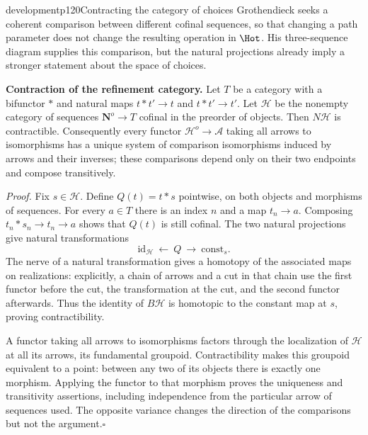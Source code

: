 \begin{dcomment}{development}{p120}{Contracting the category of choices}
Grothendieck seeks a coherent comparison between different cofinal sequences, so that changing a path parameter does not change the resulting operation in $\Hot$. His three-sequence diagram supplies this comparison, but the natural projections already imply a stronger statement about the space of choices.

\textbf{Contraction of the refinement category.}\ours\quad
Let $T$ be a category with a bifunctor $*$ and natural maps $t*t'\to t$ and $t*t'\to t'$. Let $\mathcal H$ be the nonempty category of sequences $\mathbf N^o\to T$ cofinal in the preorder of objects. Then $N\mathcal H$ is contractible. Consequently every functor $\mathcal H^o\to\mathcal A$ taking all arrows to isomorphisms has a unique system of comparison isomorphisms induced by arrows and their inverses; these comparisons depend only on their two endpoints and compose transitively.

\textit{Proof.} Fix $s\in\mathcal H$. Define $Q(t)=t*s$ pointwise, on both objects and morphisms of sequences. For every $a\in T$ there is an index $n$ and a map $t_n\to a$. Composing $t_n*s_n\to t_n\to a$ shows that $Q(t)$ is still cofinal. The two natural projections give natural transformations
\[
 \mathrm{id}_{\mathcal H}\ \longleftarrow\ Q\ \longrightarrow\ \mathrm{const}_s.
\]
The nerve of a natural transformation gives a homotopy of the associated maps on realizations: explicitly, a chain of arrows and a cut in that chain use the first functor before the cut, the transformation at the cut, and the second functor afterwards. Thus the identity of $B\mathcal H$ is homotopic to the constant map at $s$, proving contractibility.

A functor taking all arrows to isomorphisms factors through the localization of $\mathcal H$ at all its arrows, its fundamental groupoid. Contractibility makes this groupoid equivalent to a point: between any two of its objects there is exactly one morphism. Applying the functor to that morphism proves the uniqueness and transitivity assertions, including independence from the particular arrow of sequences used. The opposite variance changes the direction of the comparisons but not the argument.\hfill$\square$


\end{dcomment}
